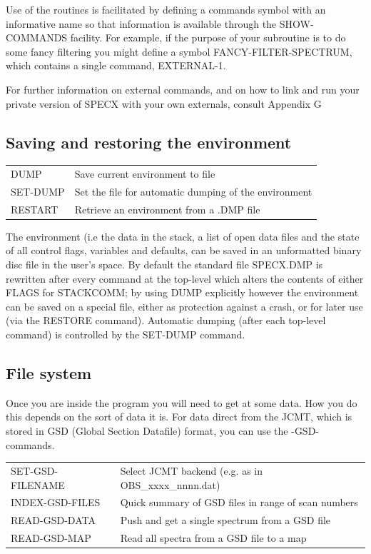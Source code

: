 \documentclass[11pt,twoside]{report}
\begin{document}
Use of the routines is facilitated by defining a commands symbol with an
informative name so that information is available through the SHOW-COMMANDS facility.
For example, if the purpose of your subroutine is to do some fancy filtering
you might define a symbol FANCY-FILTER-SPECTRUM, which contains a single 
command, EXTERNAL-1.

For further information on external commands, and on how to link and run your
private version of SPECX with your own externals, consult Appendix G

\subsection{Saving and restoring the environment}

\begin{tabular}{ll}
DUMP                   & Save current environment to file\\
SET-DUMP               & Set the file for automatic dumping of the environment\\
RESTART                & Retrieve an environment from a .DMP file\\
\end{tabular}

The environment (i.e the data in the stack, a list of open
data files and the state of all control flags, variables and defaults,
can
be saved in an unformatted binary disc file in the user's space. By default the
standard file SPECX.DMP is rewritten after every command at
the top-level which alters the contents of either FLAGS for
STACKCOMM; by using DUMP explicitly however the environment
can be saved on a special file, either as protection against a crash, or for
later use (via the RESTORE command). Automatic dumping (after each top-level
command) is controlled by the SET-DUMP command. 

\subsection{File system}

Once you are inside the program you will need to get at some data. How you
do this depends on the sort of data it is. For data direct from the JCMT,
which is stored in GSD (Global Section Datafile) format, you can use the
-GSD- commands. 

\begin{tabular}{ll}
SET-GSD-FILENAME       & Select JCMT backend (e.g. as in OBS\_xxxx\_nnnn.dat)\\
INDEX-GSD-FILES        & Quick summary of GSD files in range of scan numbers\\
READ-GSD-DATA          & Push and get a single spectrum from a GSD file\\
READ-GSD-MAP           & Read all spectra from a GSD file to a map\\
\end{tabular}
\end{document}
